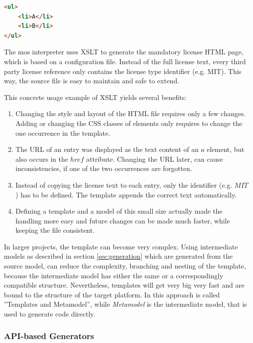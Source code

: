 \begin{lstlisting}[caption={XSLT ouput.}, language=html, label=lst:xsltoutput]
<ul>
	<li>A</li>
	<li>B</li>
</ul>
\end{lstlisting}

The mos interpreter uses \ac{XSLT} to generate the mandatory license \ac{HTML} page, which is based on a configuration file.
Instead of the full license text, every third party license reference only contains the license type identifier (e.g. MIT).
This way, the source file is easy to maintain and safe to extend.

This concrete usage example of \ac{XSLT} yields several benefits:

\begin{enumerate}
	\item Changing the style and layout of the HTML file requires only a few changes. Adding or changing the \ac{CSS} classes of elements only requires to change the one occurrence in the template.
	\item The \ac{URL} of an entry was displayed as the text content of an $a$ element, but also occurs in the $href$ attribute. Changing the \ac{URL} later, can cause inconsistencies, if one of the two occurrences are forgotten.
	\item Instead of copying the license text to each entry, only the identifier (e.g. $MIT$) has to be defined.
	The template appends the correct text automatically.
	\item Defining a template and a model of this small size actually made the handling more easy and future changes can be made much faster, while keeping the file consistent.
\end{enumerate}

In larger projects, the template can become very complex.
Using intermediate models as described in section \ref{sec:generation} which are generated from the source model, can reduce the complexity, branching and nesting of the template, because the intermediate model has either the same or a correspondingly compatible structure.
Nevertheless, templates will get very big very fast and are bound to the structure of the target platform.
In \cite{stahl_model-driven_2006} this approach is called ''Templates and Metamodel'', while \textit{Metamodel} is the intermediate model, that is used to generate code directly.

\subsubsection{API-based Generators}

